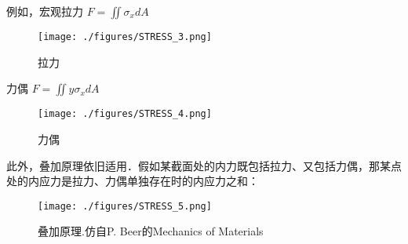 例如，宏观拉力 $F = \iint \sigma_x dA$
\begin{figure}[ht]
\centering
\texttt{[image: ./figures/STRESS\_3.png]}
\caption{拉力} \label{STRESS_fig3}
\end{figure}

力偶 $F = \iint y\sigma_x dA$
\begin{figure}[ht]
\centering
\texttt{[image: ./figures/STRESS\_4.png]}
\caption{力偶} \label{STRESS_fig4}
\end{figure}

此外，叠加原理依旧适用．假如某截面处的内力既包括拉力、又包括力偶，那某点处的内应力是拉力、力偶单独存在时的内应力之和：
\begin{figure}[ht]
\centering
\texttt{[image: ./figures/STRESS\_5.png]}
\caption{叠加原理.仿自P. Beer的Mechanics of Materials} \label{STRESS_fig5}
\end{figure}

